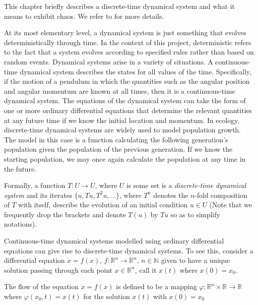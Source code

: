 This chapter briefly describes a discrete-time dynamical system and what it means to exhibit chaos. We refer to \cite{devaney2018introduction, de2013elements} for more details. 

At its most elementary level, a dynamical system is just something that evolves deterministically through time. In the context of this project, deterministic refers to the fact that a system evolves according to specified rules rather than based on random events. 
Dynamical systems arise in a variety of situations. A continuous-time dynamical system describes the states for all values of the time. Specifically, if the motion of a pendulum in which the quantities such as the angular position and angular momentum are known at all times, then it is a continuous-time dynamical system. The equations of the dynamical system can take the form of one or more ordinary differential equations that determine the relevant quantities at any future time if we know the initial location and momentum. 
In ecology, discrete-time dynamical systems are widely used to model population growth. The model in this case is a function calculating the following generation's population given the population of the previous generation. If we know the starting population, we may once again calculate the population at any time in the future. 

Formally, a function $T: U \to U$, where $U$ is some set is  a \emph{discrete-time dynamical system} and its iterates $\{u,Tu,T^2u,\ldots\}$, where $T^n$ denotes the $n$-fold composition of $T$ with itself, describe the evolution of an initial condition $u\in U$ (Note that we frequently drop the brackets and denote $T(u)$ by $Tu$ so as to simplify notations).  





Continuous-time dynamical systems modelled using ordinary differential equations can give rise to discrete-time dynamical systems. To see this, consider a differential equation $\dot{x} = f(x)$, $f: \mathbb{R}^n \to \mathbb{R}^n$, $n\in\mathbb{N}$ given to have a unique solution passing through 
each point $x\in\mathbb{R}^{n}$, call it $x(t)$ where $x(0)=x_0$. 

\begin{Definition}
   \label{Dfn_Flow}\rm
  The flow of the equation  $\dot{x} = f(x)$  is defined to be a mapping $\varphi: \mathbb{R}^n \times \mathbb{R} \to \mathbb{R}$ where $\varphi(x_0,t)= x(t)$ for the solution $x(t)$ with $x(0)=x_0$ 
\end{Definition}

